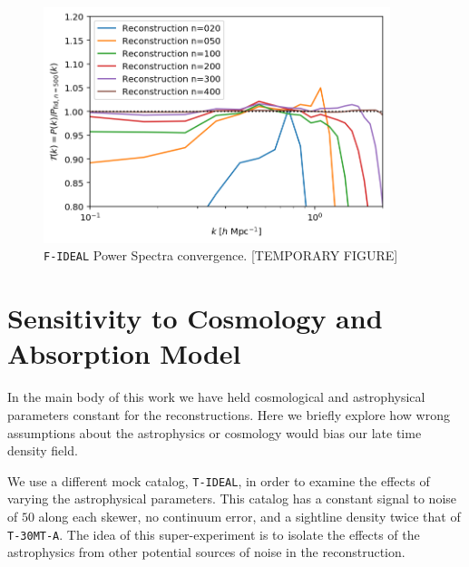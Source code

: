 \documentclass[times]{aastex62}
\begin{document}
\begin{figure}
  \centering  \includegraphics[trim=0cm 0cm 0cm 0cm,width=0.90\textwidth]{./appendix_figures/transfer_iterations.png}
    \caption{\texttt{F-IDEAL} Power Spectra convergence. [TEMPORARY FIGURE]} 
    \label{fig_sims2x2}
\end{figure}






\section{Sensitivity to Cosmology and Absorption Model}
\label{app:sens}

In the main body of this work we have held cosmological and astrophysical parameters constant for the reconstructions. Here we briefly explore how wrong assumptions about the astrophysics or cosmology would bias our late time density field. 

We use a different mock catalog, \texttt{T-IDEAL}, in order to examine the effects of varying the astrophysical parameters. This catalog has a constant signal to noise of $50$ along each skewer, no continuum error, and a sightline density twice that of \texttt{T-30MT-A}. The idea of this super-experiment is to isolate the effects of the astrophysics from other potential sources of noise in the reconstruction.
\end{document}
